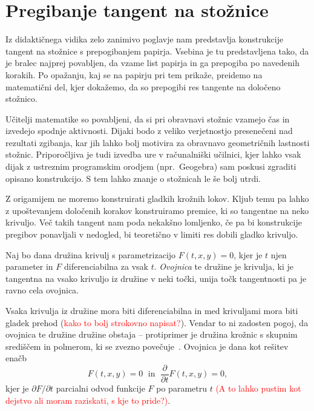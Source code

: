 \section{Pregibanje tangent na stožnice}
\label{pogl:stoznice}

Iz didaktičnega vidika zelo zanimivo poglavje nam predstavlja konstrukcije tangent na stožnice s prepogibanjem papirja. Vsebina je tu predstavljena tako, da je bralec najprej povabljen, da vzame list papirja in ga prepogiba po navedenih korakih. Po opažanju, kaj se na papirju pri tem prikaže, preidemo na matematični del, kjer dokažemo, da so prepogibi res tangente na določeno stožnico.

Učitelji matematike so povabljeni, da si pri obravnavi stožnic vzamejo čas in izvedejo spodnje aktivnosti. Dijaki bodo z veliko verjetnostjo presenečeni nad rezultati zgibanja, kar jih lahko bolj motivira za obravnavo geometričnih lastnosti stožnic. Priporočljiva je tudi izvedba ure v računalniški učilnici, kjer lahko vsak dijak z ustreznim programskim orodjem (npr.\ Geogebra) sam poskusi zgraditi opisano konstrukcijo. S tem lahko znanje o stožnicah le še bolj utrdi.

Z origamijem ne moremo konstruirati gladkih krožnih lokov. Kljub temu pa lahko z upoštevanjem določenih korakov konstruiramo premice, ki so tangentne na neko krivuljo. Več takih tangent nam poda nekakšno lomljenko, če pa bi konstrukcije pregibov ponavljali v nedogled, bi teoretično v limiti res dobili gladko krivuljo.

\begin{definicija}
    \label{def:ovojnica}
    Naj bo dana družina krivulj s parametrizacijo $F(t, x, y) = 0$, kjer je $t$ njen parameter in $F$ diferenciabilna za vsak $t$. \emph{Ovojnica} te družine je krivulja, ki je tangentna na vsako krivuljo iz družine v neki točki, unija točk tangentnosti pa je ravno cela ovojnica.
\end{definicija}

\begin{opomba}
    Vsaka krivulja iz družine mora biti diferenciabilna in med krivuljami mora biti gladek prehod (\textcolor{red}{kako to bolj strokovno napisat?}). Vendar to ni zadosten pogoj, da ovojnica te družine družine obstaja -- protiprimer je družina krožnic s skupnim središčem in polmerom, ki se zvezno povečuje~\cite{wikienvelope}. Ovojnica je dana kot rešitev enačb
    $$ F(t, x, y) = 0 \; \text{ in } \; \frac{\partial}{\partial t} F(t, x, y) = 0, $$
    kjer je $\partial F / \partial t$ parcialni odvod funkcije $F$ po parametru $t$ \textcolor{red}{(A to lahko pustim kot dejstvo ali moram raziskati, s kje to pride?)}.
\end{opomba}

